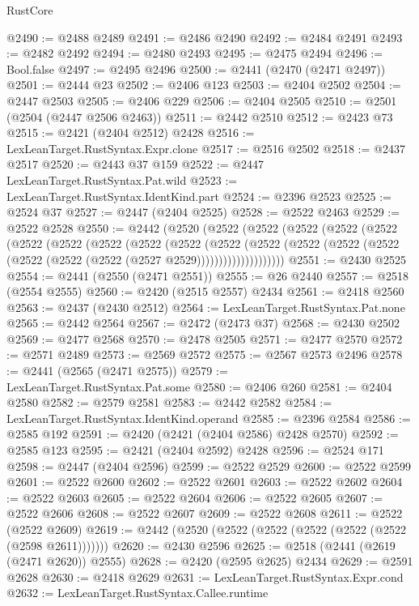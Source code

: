 \begin{lexlean}{RustCore}
\begin{coremodule}
@2490 := @2488 @2489
@2491 := @2486 @2490
@2492 := @2484 @2491
@2493 := @2482 @2492
@2494 := @2480 @2493
@2495 := @2475 @2494
@2496 := Bool.false
@2497 := @2495 @2496
@2500 := @2441 (@2470 (@2471 @2497))
@2501 := @2444 @23
@2502 := @2406 @123
@2503 := @2404 @2502
@2504 := @2447 @2503
@2505 := @2406 @229
@2506 := @2404 @2505
@2510 := @2501 (@2504 (@2447 @2506 @2463))
@2511 := @2442 @2510
@2512 := @2423 @73
@2515 := @2421 (@2404 @2512) @2428
@2516 := LexLeanTarget.RustSyntax.Expr.clone
@2517 := @2516 @2502
@2518 := @2437 @2517
@2520 := @2443 @37 @159
@2522 := @2447 LexLeanTarget.RustSyntax.Pat.wild
@2523 := LexLeanTarget.RustSyntax.IdentKind.part
@2524 := @2396 @2523
@2525 := @2524 @37
@2527 := @2447 (@2404 @2525)
@2528 := @2522 @2463
@2529 := @2522 @2528
@2550 := @2442
    (@2520
      (@2522
        (@2522
          (@2522
            (@2522
              (@2522
                (@2522
                  (@2522
                    (@2522
                      (@2522
                        (@2522
                          (@2522
                            (@2522
                              (@2522
                                (@2522 (@2522 (@2522 (@2522 (@2522 (@2527 @2529))))))))))))))))))))
@2551 := @2430 @2525
@2554 := @2441 (@2550 (@2471 @2551))
@2555 := @26 @2440
@2557 := @2518 (@2554 @2555)
@2560 := @2420 (@2515 @2557) @2434
@2561 := @2418 @2560
@2563 := @2437 (@2430 @2512)
@2564 := LexLeanTarget.RustSyntax.Pat.none
@2565 := @2442 @2564
@2567 := @2472 (@2473 @37)
@2568 := @2430 @2502
@2569 := @2477 @2568
@2570 := @2478 @2505
@2571 := @2477 @2570
@2572 := @2571 @2489
@2573 := @2569 @2572
@2575 := @2567 @2573 @2496
@2578 := @2441 (@2565 (@2471 @2575))
@2579 := LexLeanTarget.RustSyntax.Pat.some
@2580 := @2406 @260
@2581 := @2404 @2580
@2582 := @2579 @2581
@2583 := @2442 @2582
@2584 := LexLeanTarget.RustSyntax.IdentKind.operand
@2585 := @2396 @2584
@2586 := @2585 @192
@2591 := @2420 (@2421 (@2404 @2586) @2428 @2570)
@2592 := @2585 @123
@2595 := @2421 (@2404 @2592) @2428
@2596 := @2524 @171
@2598 := @2447 (@2404 @2596)
@2599 := @2522 @2529
@2600 := @2522 @2599
@2601 := @2522 @2600
@2602 := @2522 @2601
@2603 := @2522 @2602
@2604 := @2522 @2603
@2605 := @2522 @2604
@2606 := @2522 @2605
@2607 := @2522 @2606
@2608 := @2522 @2607
@2609 := @2522 @2608
@2611 := @2522 (@2522 @2609)
@2619 := @2442 (@2520 (@2522 (@2522 (@2522 (@2522 (@2522 (@2598 @2611)))))))
@2620 := @2430 @2596
@2625 := @2518 (@2441 (@2619 (@2471 @2620)) @2555)
@2628 := @2420 (@2595 @2625) @2434
@2629 := @2591 @2628
@2630 := @2418 @2629
@2631 := LexLeanTarget.RustSyntax.Expr.cond
@2632 := LexLeanTarget.RustSyntax.Callee.runtime

\end{coremodule}
\end{lexlean}

